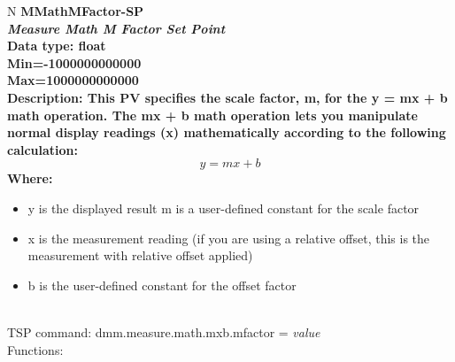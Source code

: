 \documentclass[openany]{article}
\begin{document}
		\begin{tabular}{N}
			\hline
			\bfseries MMathMFactor-SP\label{pv:mmathmfactor-sp} \\ \hline
			\emph{Measure Math M Factor Set Point} \\
			Data type: float \\
			Min=-1000000000000 \\
			Max=1000000000000 \\
			Description: This PV specifies the scale factor, m, for the y = mx + b math operation. The mx + b math operation lets you manipulate normal display readings (x) mathematically according to the following calculation: $$y = mx + b$$ Where: \begin{itemize} \item y is the displayed result  m is a user-defined constant for the scale factor \item x is the measurement reading (if you are using a relative offset, this is the measurement with relative offset applied) \item b is the user-defined constant for the offset factor \end{itemize} \\
			TSP command: dmm.measure.math.mxb.mfactor = \emph{value} \\
			Functions: \\
			\arrayrulecolor{\FuncTableBorderColor}

		\end{tabular}
\end{document}

